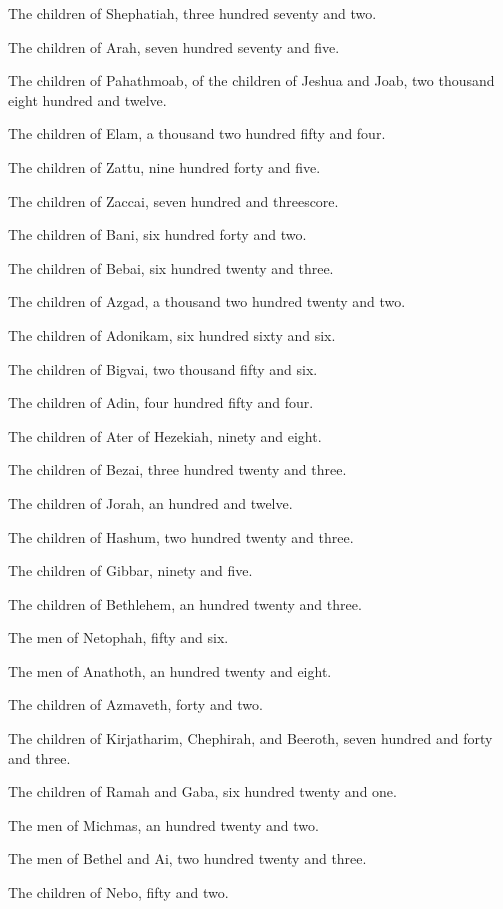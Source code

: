 \Verse The children of Shephatiah, three hundred seventy and two.

\Verse The children of Arah, seven hundred seventy and five.

\Verse The children of Pahathmoab, of the children of Jeshua and Joab, two thousand eight hundred and twelve.

\Verse The children of Elam, a thousand two hundred fifty and four.

\Verse The children of Zattu, nine hundred forty and five.

\Verse The children of Zaccai, seven hundred and threescore.

\Verse The children of Bani, six hundred forty and two.

\Verse The children of Bebai, six hundred twenty and three.

\Verse The children of Azgad, a thousand two hundred twenty and two.

\Verse The children of Adonikam, six hundred sixty and six.

\Verse The children of Bigvai, two thousand fifty and six.

\Verse The children of Adin, four hundred fifty and four.

\Verse The children of Ater of Hezekiah, ninety and eight.

\Verse The children of Bezai, three hundred twenty and three.

\Verse The children of Jorah, an hundred and twelve.

\Verse The children of Hashum, two hundred twenty and three.

\Verse The children of Gibbar, ninety and five.

\Verse The children of Bethlehem, an hundred twenty and three.

\Verse The men of Netophah, fifty and six.

\Verse The men of Anathoth, an hundred twenty and eight.

\Verse The children of Azmaveth, forty and two.

\Verse The children of Kirjatharim, Chephirah, and Beeroth, seven hundred and forty and three.

\Verse The children of Ramah and Gaba, six hundred twenty and one.

\Verse The men of Michmas, an hundred twenty and two.

\Verse The men of Bethel and Ai, two hundred twenty and three.

\Verse The children of Nebo, fifty and two.

